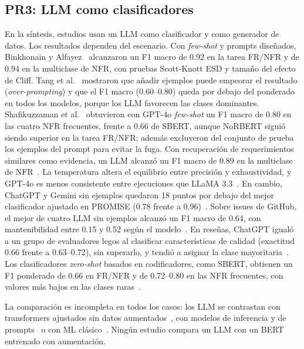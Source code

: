 \documentclass[conference]{IEEEtran}
\begin{document}
\subsection{PR3: LLM como clasificadores}\label{sec:pr3}
En la síntesis, \nLLMclas{} estudios usan un LLM como clasificador y \nLLMgen{} como generador de datos. Los resultados dependen del escenario. Con \emph{few-shot} y prompts diseñados, Binkhonain y Alfayez~\cite{Binkhonain2025-Prompts} alcanzaron un F1 macro de 0.92 en la tarea FR/NFR y de 0.94 en la multiclase de NFR, con pruebas Scott-Knott ESD y tamaño del efecto de Cliff. Tang et al.~\cite{Tang2025-FewShot} mostraron que añadir ejemplos puede empeorar el resultado (\emph{over-prompting}) y que el F1 macro (0.60--0.80) queda por debajo del ponderado en todos los modelos, porque los LLM favorecen las clases dominantes. Shafikuzzaman et al.~\cite{Shafikuzzaman2025-Effectiveness} obtuvieron con GPT-4o \emph{few-shot} un F1 macro de 0.80 en las cuatro NFR frecuentes, frente a 0.66 de SBERT, aunque NoRBERT siguió siendo superior en la tarea FR/NFR; además excluyeron del conjunto de prueba los ejemplos del prompt para evitar la fuga. Con recuperación de requerimientos similares como evidencia, un LLM alcanzó un F1 macro de 0.89 en la multiclase de NFR~\cite{Aloufi2026-Evireqrag}. La temperatura altera el equilibrio entre precisión y exhaustividad, y GPT-4o es menos consistente entre ejecuciones que LLaMA 3.3~\cite{Karlsson2025-Reliable}. En cambio, ChatGPT y Gemini sin ejemplos quedaron 18 puntos por debajo del mejor clasificador ajustado en PROMISE (0.78 frente a 0.96)~\cite{Saleem2025-Generative}. Sobre issues de GitHub, el mejor de cuatro LLM sin ejemplos alcanzó un F1 macro de 0.64, con mantenibilidad entre 0.15 y 0.52 según el modelo~\cite{Kamal2026-GitReq}. En reseñas, ChatGPT igualó a un grupo de evaluadores legos al clasificar características de calidad (exactitud 0.66 frente a 0.63--0.72), sin superarlo, y tendió a asignar la clase mayoritaria~\cite{Groen2025-Classification}. Los clasificadores \emph{zero-shot} basados en codificadores, como SBERT, obtienen un F1 ponderado de 0.66 en FR/NFR y de 0.72--0.80 en las NFR frecuentes, con valores más bajos en las clases raras~\cite{Alhoshan2023-ZeroShot}.

La comparación es incompleta en todos los casos: los LLM se contrastan con transformers ajustados sin datos aumentados~\cite{Binkhonain2025-Prompts}, con modelos de inferencia y de prompts~\cite{Fazelnia2024-Lessons} o con ML clásico~\cite{Chaudhary2025-Exploring}. Ningún estudio compara un LLM con un BERT entrenado con aumentación.
\end{document}
